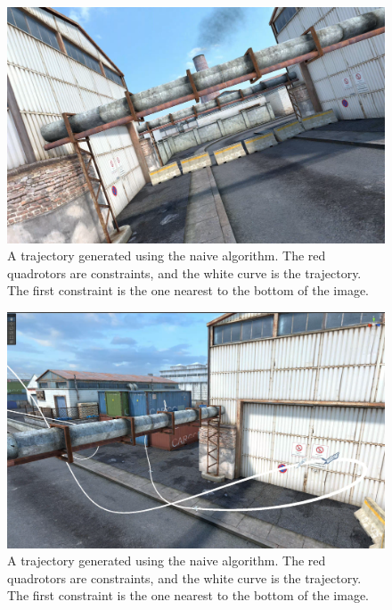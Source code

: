 \documentclass[pageno]{jpaper}
\begin{document}
\begin{figure}[hbt]
  \includegraphics[width=\linewidth]{data/onboard.png}
  \caption{A trajectory generated using the naive algorithm. The red quadrotors are constraints, and the white curve is the trajectory. The first constraint is the one nearest to the bottom of the image.}
  \label{fig:onboard}
\end{figure}

\begin{figure}[hbt]
  \includegraphics[width=\linewidth]{data/rotation.png}
  \caption{A trajectory generated using the naive algorithm. The red quadrotors are constraints, and the white curve is the trajectory. The first constraint is the one nearest to the bottom of the image.}
  \label{fig:rotation}
\end{figure}
\end{document}

